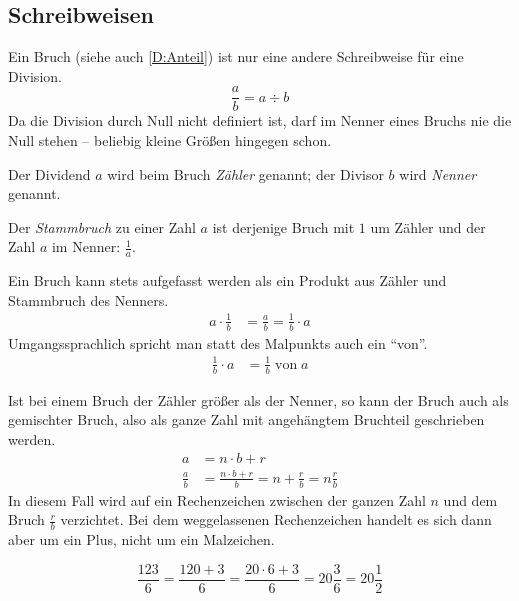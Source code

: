 \subsection{Schreibweisen}

Ein Bruch (siehe auch \ref{D:Anteil}) ist nur eine andere Schreibweise für eine Division.
\begin{equation*}
 \frac{a}{b} = a \div b
\end{equation*}
Da die Division durch Null nicht definiert ist, darf im Nenner eines Bruchs nie die Null stehen -- beliebig kleine Größen hingegen schon.

Der Dividend \(a\) wird beim Bruch \emph{Zähler} genannt; der Divisor \(b\) wird \emph{Nenner} genannt.

\begin{defi}[Stammbruch] \label{def:stammbruch}
 Der \emph{Stammbruch} zu einer Zahl \(a\) ist derjenige Bruch mit \(1\) um Zähler und der Zahl \(a\) im Nenner: \(\frac{1}{a}\).
\end{defi}

\begin{beme}
 Ein Bruch kann stets aufgefasst werden als ein Produkt aus Zähler und Stammbruch des Nenners.
 \begin{align*}
  a\cdot \frac{1}{b} &= \frac{a}{b} = \frac{1}{b}\cdot a
 \end{align*}
 Umgangssprachlich spricht man statt des Malpunkts auch ein "`von"'.
 \begin{align*}
  \frac{1}{b}\cdot a &= \frac{1}{b}\;\text{von}\;a
 \end{align*}

\end{beme}


\begin{defi}
 Ist bei einem Bruch der Zähler größer als der Nenner, so kann der Bruch auch als gemischter Bruch, also als ganze Zahl mit angehängtem Bruchteil geschrieben werden.
 \begin{align*}
  a&= n\cdot b +r \\
  \frac{a}{b}&= \frac{n\cdot b+r}{b} = n + \frac{r}{b} = n\frac{r}{b}
 \end{align*}
 In diesem Fall wird auf ein Rechenzeichen zwischen der ganzen Zahl \(n\) und dem Bruch \(\frac{r}{b}\) verzichtet. Bei dem weggelassenen Rechenzeichen handelt es sich dann aber um ein Plus, nicht um ein Malzeichen.
\end{defi}

\begin{bsp}
 \begin{equation*}
  \frac{123}{6} = \frac{120+3}{6}= \frac{20\cdot 6+3}{6} = 20\frac{3}{6} = 20\frac{1}{2}
 \end{equation*}
\end{bsp}


